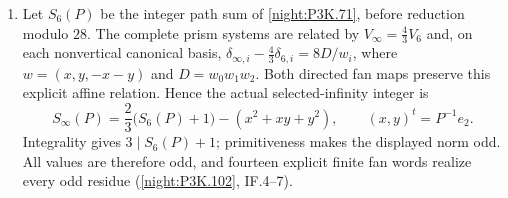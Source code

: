 \begin{enumerate}[label=\arabic*.]
\item Let $S_6(P)$ be the integer path sum of
  \cref{night:P3K.71}, before reduction modulo $28$.
  The complete prism systems are related by
  $V_\infty=\tfrac43V_6$ and, on each nonvertical
  canonical basis, $\delta_{\infty,i}-\tfrac43\delta_{6,i}=8D/w_i$,
  where $w=(x,y,-x-y)$ and $D=w_0w_1w_2$.
  Both directed fan maps preserve this explicit affine relation.
  Hence the actual selected-infinity integer is
  \[
  S_\infty(P)=\frac23\bigl(S_6(P)+1\bigr)
             -(x^2+xy+y^2),\qquad (x,y)^t=P^{-1}e_2.
  \]
  Integrality gives $3\mid S_6(P)+1$; primitiveness makes the
  displayed norm odd. All values are therefore odd, and fourteen
  explicit finite fan words realize every odd residue
  (\cref{night:P3K.102}, IF.4--7).
\end{enumerate}

